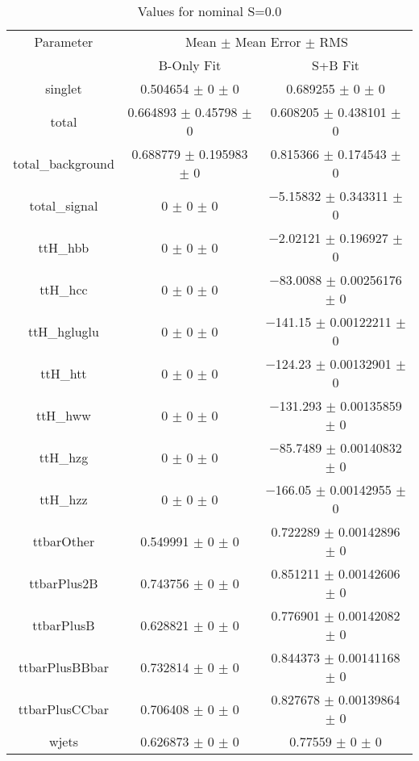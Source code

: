 \begin{table}
\centering
\caption{Values for nominal S=0.0}
\begin{tabular}{ccc}
\toprule
Parameter & \multicolumn{2}{c}{Mean $\pm$ Mean Error $\pm$ RMS}\\
 & B-Only Fit & S+B Fit\\
\midrule
singlet & \num{0.504654} $\pm$ \num{0} $\pm$ \num{0} & \num{0.689255} $\pm$ \num{0} $\pm$ \num{0}\\
total & \num{0.664893} $\pm$ \num{0.45798} $\pm$ \num{0} & \num{0.608205} $\pm$ \num{0.438101} $\pm$ \num{0}\\
total\_background & \num{0.688779} $\pm$ \num{0.195983} $\pm$ \num{0} & \num{0.815366} $\pm$ \num{0.174543} $\pm$ \num{0}\\
total\_signal & \num{0} $\pm$ \num{0} $\pm$ \num{0} & \num{-5.15832} $\pm$ \num{0.343311} $\pm$ \num{0}\\
ttH\_hbb & \num{0} $\pm$ \num{0} $\pm$ \num{0} & \num{-2.02121} $\pm$ \num{0.196927} $\pm$ \num{0}\\
ttH\_hcc & \num{0} $\pm$ \num{0} $\pm$ \num{0} & \num{-83.0088} $\pm$ \num{0.00256176} $\pm$ \num{0}\\
ttH\_hgluglu & \num{0} $\pm$ \num{0} $\pm$ \num{0} & \num{-141.15} $\pm$ \num{0.00122211} $\pm$ \num{0}\\
ttH\_htt & \num{0} $\pm$ \num{0} $\pm$ \num{0} & \num{-124.23} $\pm$ \num{0.00132901} $\pm$ \num{0}\\
ttH\_hww & \num{0} $\pm$ \num{0} $\pm$ \num{0} & \num{-131.293} $\pm$ \num{0.00135859} $\pm$ \num{0}\\
ttH\_hzg & \num{0} $\pm$ \num{0} $\pm$ \num{0} & \num{-85.7489} $\pm$ \num{0.00140832} $\pm$ \num{0}\\
ttH\_hzz & \num{0} $\pm$ \num{0} $\pm$ \num{0} & \num{-166.05} $\pm$ \num{0.00142955} $\pm$ \num{0}\\
ttbarOther & \num{0.549991} $\pm$ \num{0} $\pm$ \num{0} & \num{0.722289} $\pm$ \num{0.00142896} $\pm$ \num{0}\\
ttbarPlus2B & \num{0.743756} $\pm$ \num{0} $\pm$ \num{0} & \num{0.851211} $\pm$ \num{0.00142606} $\pm$ \num{0}\\
ttbarPlusB & \num{0.628821} $\pm$ \num{0} $\pm$ \num{0} & \num{0.776901} $\pm$ \num{0.00142082} $\pm$ \num{0}\\
ttbarPlusBBbar & \num{0.732814} $\pm$ \num{0} $\pm$ \num{0} & \num{0.844373} $\pm$ \num{0.00141168} $\pm$ \num{0}\\
ttbarPlusCCbar & \num{0.706408} $\pm$ \num{0} $\pm$ \num{0} & \num{0.827678} $\pm$ \num{0.00139864} $\pm$ \num{0}\\
wjets & \num{0.626873} $\pm$ \num{0} $\pm$ \num{0} & \num{0.77559} $\pm$ \num{0} $\pm$ \num{0}\\
\bottomrule
\end{tabular}
\end{table}